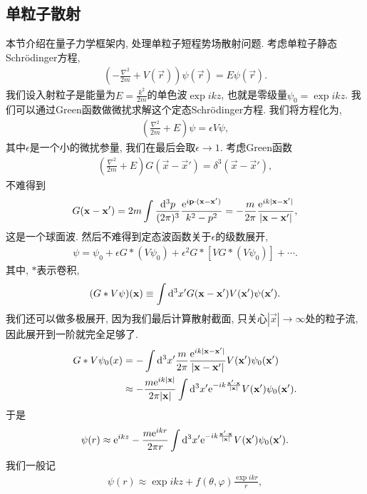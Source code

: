 \subsection{单粒子散射}
本节介绍在量子力学框架内, 处理单粒子短程势场散射问题. 考虑单粒子静态Schr\"odinger方程,
\begin{align}
    (-\frac{\nabla^2}{2m}+V(\vec r))\psi(\vec r)=E\psi(\vec r).
\end{align}
我们设入射粒子是能量为$E=\frac{k^2}{2m}$的单色波$\exp{ikz}$, 也就是零级量$\psi_0=\exp{ikz}$. 我们可以通过Green函数做微扰求解这个定态Schr\"odinger方程. 我们将方程化为, 
\begin{align}
    (\frac{\nabla^2}{2m}+E)\psi=\epsilon V\psi,
\end{align}
其中$\epsilon$是一个小的微扰参量, 我们在最后会取$\epsilon\to1$. 考虑Green函数
\begin{align}
    (\frac{\nabla^2}{2m}+E)G(\vec x-\vec x')=\delta^3(\vec x-\vec x'),
\end{align}
不难得到
\begin{align}
    G(\mathbf{x}-\mathbf{x}')=2m\int\frac{\mathrm d^3p}{(2\pi)^3}\frac{\mathrm e^{i\mathbf{p}\cdot(\mathbf{x}-\mathbf{x}')}}{k^2-p^2}=-\frac m{2\pi}\frac{\mathrm e^{ik|\mathbf{x}-\mathbf{x}'|}}{|\mathbf{x}-\mathbf{x}'|},
\end{align}
这是一个球面波. 然后不难得到定态波函数关于$\epsilon$的级数展开, 
\begin{align}
    \psi=\psi_0+\epsilon G*(V\psi_0)+\epsilon^2 G*[VG*(V\psi_0)]+\cdots.
\end{align}
其中, $*$表示卷积,
\begin{align}
    (G*V\psi)(\mathbf{x})\equiv\int\mathrm d^3x'G(\mathbf{x}-\mathbf{x}')V(\mathbf{x}')\psi(\mathbf{x}').
\end{align}
我们还可以做多极展开, 因为我们最后计算散射截面, 只关心$|\vec x|\to\infty$处的粒子流, 因此展开到一阶就完全足够了.
\begin{align}
    G*V\psi_0(x)&=-\int\mathrm d^3x'\frac m{2\pi}\frac{\mathrm e^{ik|\mathbf{x}-\mathbf{x}'|}}{|\mathbf{x}-\mathbf{x}'|}V(\mathbf{x}')\psi_0(\mathbf{x}')\notag\\
    &\approx-\frac{m\mathrm e^{ik|\mathbf{x}|}}{2\pi|\mathbf{x}|}\int\mathrm d^3x'\mathrm e^{-ik\frac{\mathbf{x}'\cdot\mathbf{x}}{|\mathbf{x}|}}V(\mathbf{x}')\psi_0(\mathbf{x}').
\end{align}
于是
\begin{align}
    \psi(r)\approx\mathrm e^{ikz}-\frac{m\mathrm e^{ikr}}{2\pi r}\int\mathrm d^3x'\mathrm e^{-ik\frac{\mathbf{x}'\cdot\mathbf{x}}{|\mathbf{x}|}}V(\mathbf{x}')\psi_0(\mathbf{x}').
\end{align}
我们一般记
\begin{align}
    \psi(r)\approx\exp{ikz}+f(\theta,\varphi)\frac{\exp{ikr}}{r},
\end{align}
